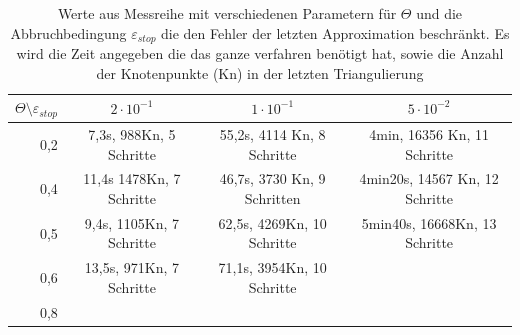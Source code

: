 \begin{table}[!htbp]
	\begin{tabular}{r|c|c|c}
		$\Theta\setminus\varepsilon_{stop}$& $2\cdot10^{-1}$ & $1\cdot10^{-1}$&$5\cdot10^{-2}$ \\
		\hline
		0,2&7,3s, 988Kn, 5 Schritte&55,2s, 4114 Kn, 8 Schritte&4min, 16356 Kn, 11 Schritte\\	
		0,4&11,4s 1478Kn, 7 Schritte&46,7s, 3730 Kn, 9 Schritten&4min20s, 14567 Kn, 12 Schritte\\
		0,5&9,4s, 1105Kn, 7 Schritte&62,5s, 4269Kn, 10 Schritte&5min40s, 16668Kn, 13 Schritte\\
		0,6&13,5s, 971Kn, 7 Schritte&71,1s, 3954Kn, 10 Schritte&\\
		0,8&&&\\
	\end{tabular}
	\caption{Werte aus Messreihe mit verschiedenen Parametern für $\Theta$ und die Abbruchbedingung $\varepsilon_{stop}$ die den Fehler der letzten Approximation beschränkt. Es wird die Zeit angegeben die das ganze verfahren benötigt hat, sowie die Anzahl der Knotenpunkte (Kn) in der letzten Triangulierung}
\end{table}
